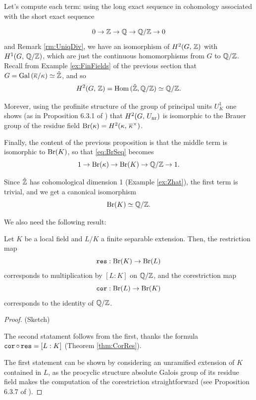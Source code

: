 \documentclass[a4paper, oneside]{memoir}
\begin{document}
Let's compute each term: using the long exact sequence in cohomology associated with the short exact sequence

\[
    0\to\mathbb{Z}\to\mathbb{Q}\to\mathbb{Q}/\mathbb{Z}\to 0
\]
and Remark \ref{rm:UniqDiv}, we have an isomorphism of $H^{2}( G, \, \mathbb{Z} )$ with $H^{1}( G, \, \mathbb{Q}/\mathbb{Z} )$, which are just the continuous homomorphisms from $G$ to $\mathbb{Q}/\mathbb{Z}$. Recall from Example
\ref{ex:FinFields} of the previous
section that $G=\operatorname{Gal}{(\overline{\kappa}/\kappa)}\simeq\hat{\mathbb{Z}}$, and so
\[
    H^{2}( G, \, \mathbb{Z} )=\operatorname{Hom}{(\hat{\mathbb{Z}},\mathbb{Q}/\mathbb{Z})}\simeq\mathbb{Q}/\mathbb{Z}.
\]

Morever, using the profinite structure of the group of principal units $U_K^1$ one shows (as in Proposition 6.3.1 of \cite{SzamuelyGille}) that $H^{2}( G, \, U_{\text{nr}} )$ is isomorphic to
the Brauer group of the residue field $\mathrm{Br}(\kappa)=H^{2}( \kappa, \, \overline{\kappa}^\times )$.

Finally, the content of the previous proposition is that the middle term is isomorphic to $\mathrm{Br}(K)$, so that \eqref{eq:BrSeq} becomes
\[
    1\to\mathrm{Br}(\kappa)\to\mathrm{Br}(K)\to\mathbb{Q}/\mathbb{Z}\to 1.
\]

Since $\hat{\mathbb{Z}}$ has cohomological dimension 1 (Example \ref{ex:Zhat}), the first term is trivial, and we get a canonical isomorphism
\begin{equation}\label{eq:BrK}
    \mathrm{Br}(K)\simeq\mathbb{Q}/\mathbb{Z}.
\end{equation}

We also need the following result:

\begin{proposition}\label{prop:BrCorRes}
    Let $K$ be a local field and $L/K$ a finite separable extension. Then, the restriction map
    \[
        \operatorname{\mathtt{res}}: \mathrm{Br}(K)\to\mathrm{Br}(L)
    \]
    corresponds to multiplication by $[L:K]$ on $\mathbb{Q}/\mathbb{Z}$,
    and the corestriction map
    \[
        \operatorname{\mathtt{cor}}: \mathrm{Br}(L)\to\mathrm{Br}(K)
    \]
    corresponds to the identity of $\mathbb{Q}/\mathbb{Z}$.
\end{proposition}

\begin{proof}{(Sketch)}

    The second statament follows from the first, thanks the formula $\operatorname{\mathtt{cor}} \circ \operatorname{\mathtt{res}} = [L:K]$ (Theorem \ref{thm:CorRes}).

    The first statement can be shown by considering an unramified extension of $K$ contained in $L$, as the procyclic structure absolute Galois group of its residue field makes the computation of the corestriction
    straightforward (see Proposition 6.3.7 of \cite{SzamuelyGille}).
\end{proof}
\end{document}
